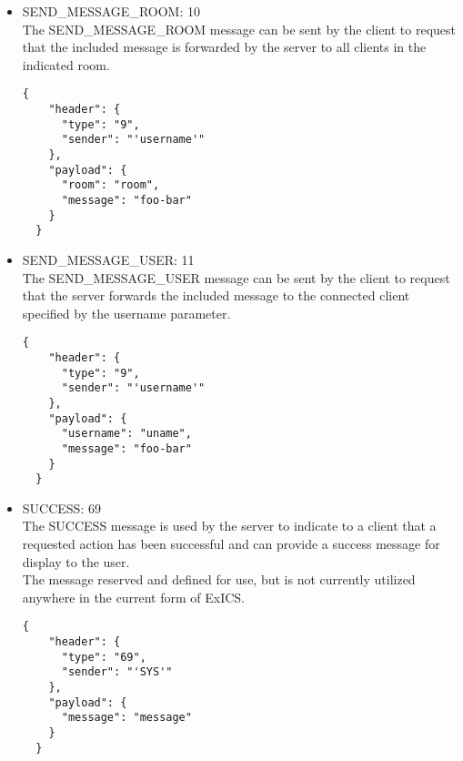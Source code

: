 \begin{itemize}
\item SEND\_MESSAGE\_ROOM: 10\\
  The SEND\_MESSAGE\_ROOM message can be sent by the client to request that the included message is forwarded by the server to all clients in the indicated room.
  \lstset{language=JSON}
  \begin{lstlisting}[tabsize=2,breaklines=true]
  {
    "header": {
      "type": "9",
      "sender": "'username'"
    },
    "payload": {
      "room": "room",
      "message": "foo-bar"
    }
  }
  \end{lstlisting}

\item SEND\_MESSAGE\_USER: 11\\
  The SEND\_MESSAGE\_USER message can be sent by the client to request that the server forwards the included message to the connected client specified by the username parameter.
  \lstset{language=JSON}
  \begin{lstlisting}[tabsize=2,breaklines=true]
  {
    "header": {
      "type": "9",
      "sender": "'username'"
    },
    "payload": {
      "username": "uname",
      "message": "foo-bar"
    }
  }  
  \end{lstlisting}

\item SUCCESS: 69\\
  The SUCCESS message is used by the server to indicate to a client that a requested action has been successful and can provide a success message for display to the user.\\
  The message reserved and defined for use, but is not currently utilized anywhere in the current form of ExICS.
  \lstset{language=JSON}
  \begin{lstlisting}[tabsize=2,breaklines=true]
  {
    "header": {
      "type": "69",
      "sender": "'SYS'"
    },
    "payload": {
      "message": "message"
    }
  }
  \end{lstlisting}


\end{itemize}
